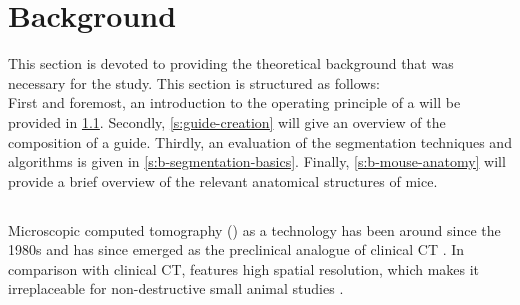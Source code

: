 

\chapter{Background}\label{c:background}
This section is devoted to providing the theoretical background that was necessary for the study.
This section is structured as follows:\\
First and foremost, an introduction to the operating principle of a \mct\space will be provided in \cref{s:b-microct}.
Secondly, \cref{s:guide-creation} will give an overview of the composition of a guide.
Thirdly, an evaluation of the segmentation techniques and algorithms is given in \cref{s:b-segmentation-basics}.
Finally, \cref{s:b-mouse-anatomy} will provide a brief overview of the relevant anatomical structures of mice.


\section{\mct}\label{s:b-microct}
Microscopic computed tomography (\mct) as a technology has been around since the 1980s and has since emerged as the preclinical analogue of clinical CT \cite{clarkAdvancesMicroCTImaging2021,ritmanCurrentStatusDevelopments2011}.
In comparison with clinical CT, \mct\space features high spatial resolution, which makes it irreplaceable for non-destructive small animal studies \cite{clarkAdvancesMicroCTImaging2021,ritmanCurrentStatusDevelopments2011,keklikoglouMicroCTBiologicalBiomedical2021}.


